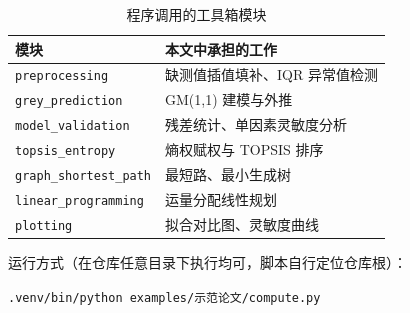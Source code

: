 \documentclass[12pt]{article}
\begin{document}
\begin{table}[!htbp]
  \centering
  \small
  \caption{程序调用的工具箱模块}
  \label{tab:modules}
  \begin{tabular}{ll}
    \toprule
    模块 & 本文中承担的工作 \\
    \midrule
    \texttt{preprocessing} & 缺测值插值填补、IQR 异常值检测 \\
    \texttt{grey\_prediction} & GM(1,1) 建模与外推 \\
    \texttt{model\_validation} & 残差统计、单因素灵敏度分析 \\
    \texttt{topsis\_entropy} & 熵权赋权与 TOPSIS 排序 \\
    \texttt{graph\_shortest\_path} & 最短路、最小生成树 \\
    \texttt{linear\_programming} & 运量分配线性规划 \\
    \texttt{plotting} & 拟合对比图、灵敏度曲线 \\
    \bottomrule
  \end{tabular}
\end{table}

运行方式（在仓库任意目录下执行均可，脚本自行定位仓库根）：

\begin{center}
\texttt{.venv/bin/python examples/示范论文/compute.py}
\end{center}
\end{document}
